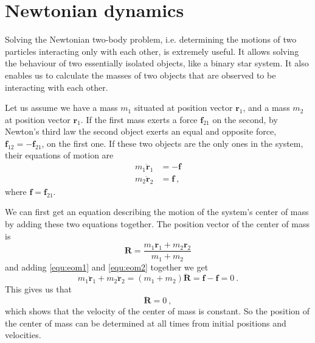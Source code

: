 \documentclass[english, oneside]{HYgradu}
\begin{document}
\section{Newtonian dynamics}

Solving the Newtonian two-body problem, i.e. determining the motions of two particles interacting only with each other, is extremely useful. It allows solving the behaviour of two essentially isolated objects, like a binary star system. It also enables us to calculate the masses of two objects that are observed to be interacting with each other.

Let us assume we have a mass $m_1$ situated at position vector $\mathbf{r}_1$, and a mass $m_2$ at position vector $\mathbf{r}_1$. If the first mass exerts a force $\mathbf{f}_{21}$ on the second, by Newton's third law the second object exerts an equal and opposite force, $\mathbf{f}_{12} = -\mathbf{f}_{21}$, on the first one. If these two objects are the only ones in the system, their equations of motion are
\begin{align}
m_1 \mathbf{\ddot{r}}_1 &= -\mathbf{f} \label{equ:eom1} \\
m_2 \mathbf{\ddot{r}}_2 &= \mathbf{f} \label{equ:eom2} \ ,
\end{align}
where $\mathbf{f} = \mathbf{f}_{21}$.

We can first get an equation describing the motion of the system's center of mass by adding these two equations together. The position vector of the center of mass is
\begin{equation}
\mathbf{R} = \frac{m_1 \mathbf{r}_1 + m_2 \mathbf{r}_2}{m_1 + m_2}
\end{equation}
and adding \ref{equ:eom1} and \ref{equ:eom2} together we get
\begin{equation}
m_1 \mathbf{\ddot{r}}_1 + m_2 \mathbf{\ddot{r}}_2 = (m_1 + m_2) \mathbf{\ddot{R}} = \mathbf{f} - \mathbf{f} = 0 \ .
\end{equation}
This gives us that
\begin{equation}
\mathbf{\ddot{R}} = 0 \ ,
\end{equation}
which shows that the velocity of the center of mass is constant. So the position of the center of mass can be determined at all times from initial positions and velocities.
\end{document}
